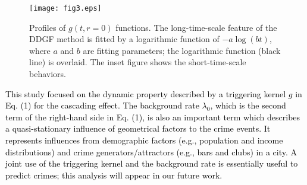 \documentclass[review]{elsarticle}
\newcommand{\blue}[1]{\textcolor{black}{#1}}
\begin{document}
\begin{figure}[]
\centering
\texttt{[image: fig3.eps]}
\caption{
  Profiles of $g(t,r=0)$ functions.
  The long-time-scale feature of the DDGF method is fitted by a logarithmic function of $-a \log(b t)$, where $a$ and $b$ are fitting parameters;
  the logarithmic function (black line) is overlaid.
 The inset figure shows the short-time-scale behaviors.
  }
  \label{fig3}
\end{figure}


\blue{
This study focused on the dynamic property described by a triggering kernel $g$ in Eq. (1)
for the cascading effect. 
The background rate $\lambda_0$, which is the second term of the right-hand side in Eq. (1),
is also an important term which describes a quasi-stationary influence of geometrical factors to the crime events.
It represents influences from  demographic factors (e.g., population and income distributions)
and crime generators/attractors (e.g., bars and clubs)\cite{block2011} in a city.
A joint use of the triggering kernel and the background rate 
is essentially useful to predict crimes;
this analysis will appear in our future work. 
}
\end{document}
